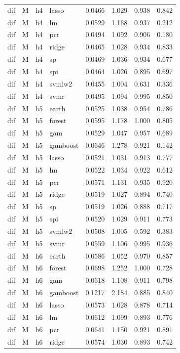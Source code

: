 \begin{ThreePartTable}
\begin{longtable}[t]{llclcccc}
dif & M & h4 & lasso & 0.0466 & 1.029 & 0.938 & 0.842\\
dif & M & h4 & lm & 0.0529 & 1.168 & 0.937 & 0.212\\
dif & M & h4 & pcr & 0.0494 & 1.092 & 0.906 & 0.180\\
dif & M & h4 & ridge & 0.0465 & 1.028 & 0.934 & 0.833\\
dif & M & h4 & sp & 0.0469 & 1.036 & 0.934 & 0.677\\
dif & M & h4 & spi & 0.0464 & 1.026 & 0.895 & 0.697\\
dif & M & h4 & svmlw2 & 0.0455 & 1.004 & 0.631 & 0.336\\
dif & M & h4 & svmr & 0.0495 & 1.094 & 0.995 & 0.850\\
\addlinespace
dif & M & h5 & earth & 0.0525 & 1.038 & 0.954 & 0.786\\
dif & M & h5 & forest & 0.0595 & 1.178 & 1.000 & 0.805\\
dif & M & h5 & gam & 0.0529 & 1.047 & 0.957 & 0.689\\
dif & M & h5 & gamboost & 0.0646 & 1.278 & 0.921 & 0.142\\
dif & M & h5 & lasso & 0.0521 & 1.031 & 0.913 & 0.777\\
dif & M & h5 & lm & 0.0522 & 1.034 & 0.922 & 0.612\\
dif & M & h5 & pcr & 0.0571 & 1.131 & 0.935 & 0.920\\
dif & M & h5 & ridge & 0.0519 & 1.027 & 0.894 & 0.740\\
dif & M & h5 & sp & 0.0519 & 1.026 & 0.888 & 0.717\\
dif & M & h5 & spi & 0.0520 & 1.029 & 0.911 & 0.773\\
dif & M & h5 & svmlw2 & 0.0508 & 1.005 & 0.592 & 0.383\\
dif & M & h5 & svmr & 0.0559 & 1.106 & 0.995 & 0.936\\
\addlinespace
dif & M & h6 & earth & 0.0586 & 1.052 & 0.970 & 0.857\\
dif & M & h6 & forest & 0.0698 & 1.252 & 1.000 & 0.728\\
dif & M & h6 & gam & 0.0618 & 1.108 & 0.911 & 0.798\\
dif & M & h6 & gamboost & 0.1217 & 2.184 & 0.885 & 0.840\\
dif & M & h6 & lasso & 0.0573 & 1.028 & 0.878 & 0.714\\
dif & M & h6 & lm & 0.0612 & 1.099 & 0.893 & 0.776\\
dif & M & h6 & pcr & 0.0641 & 1.150 & 0.921 & 0.891\\
dif & M & h6 & ridge & 0.0574 & 1.030 & 0.893 & 0.742\\

\end{longtable}
\end{ThreePartTable}
